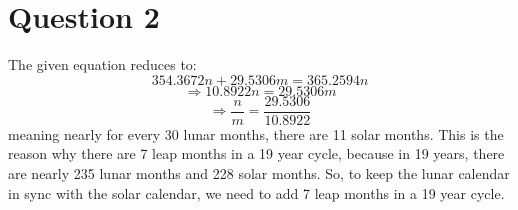 \documentclass{article}
\begin{document}
\section*{Question 2}
The given equation reduces to:
\[354.3672n + 29.5306m = 365.2594n\]
\[\Rightarrow 10.8922n = 29.5306m\]
\[\Rightarrow \frac{n}{m} = \frac{29.5306}{10.8922}\]
meaning nearly for every 30 lunar months, there are 11 solar months. This is the reason why there are 7 leap months in a 19 year cycle, because in 19 years, there are nearly 235 lunar months and 228 solar months. So, to keep the lunar calendar in sync with the solar calendar, we need to add 7 leap months in a 19 year cycle.
\end{document}
